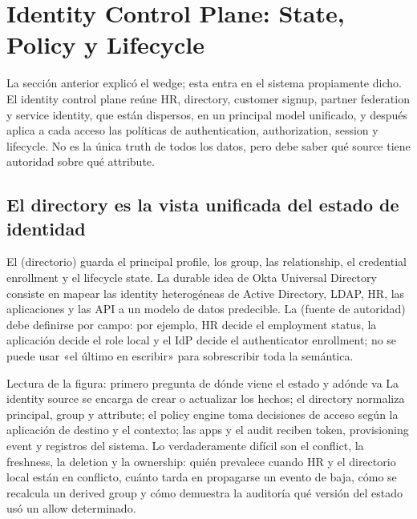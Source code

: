 \section{Identity Control Plane: State, Policy y Lifecycle}

La sección anterior explicó el wedge; esta entra en el sistema propiamente dicho. El identity control plane reúne HR, directory, customer signup, partner federation y service identity, que están dispersos, en un principal model unificado, y después aplica a cada acceso las políticas de authentication, authorization, session y lifecycle. No es la única truth de todos los datos, pero debe saber qué source tiene autoridad sobre qué attribute.

\subsection{El directory es la vista unificada del estado de identidad}

El  (directorio) guarda el principal profile, los group, las relationship, el credential enrollment y el lifecycle state. La durable idea de Okta Universal Directory consiste en mapear las identity heterogéneas de Active Directory, LDAP, HR, las aplicaciones y las API a un modelo de datos predecible. La  (fuente de autoridad) debe definirse por campo: por ejemplo, HR decide el employment status, la aplicación decide el role local y el IdP decide el authenticator enrollment; no se puede usar «el último en escribir» para sobrescribir toda la semántica.


\begin{knowledgebox}{Lectura de la figura: primero pregunta de dónde viene el estado y adónde va}
La identity source se encarga de crear o actualizar los hechos; el directory normaliza principal, group y attribute; el policy engine toma decisiones de acceso según la aplicación de destino y el contexto; las apps y el audit reciben token, provisioning event y registros del sistema. Lo verdaderamente difícil son el conflict, la freshness, la deletion y la ownership: quién prevalece cuando HR y el directorio local están en conflicto, cuánto tarda en propagarse un evento de baja, cómo se recalcula un derived group y cómo demuestra la auditoría qué versión del estado usó un allow determinado.
\end{knowledgebox}

